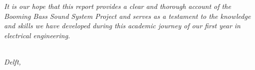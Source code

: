 \textit{It is our hope that this report provides a clear and thorough account of the Booming Bass Sound System Project and serves as a testament to the knowledge and skills we have developed during this academic journey of our first year in electrical engineering.
}

\begin{flushright}
{\makeatletter\itshape
    \@author \\
    Delft, \monthname{} \the\year{}
\makeatother}
\end{flushright}